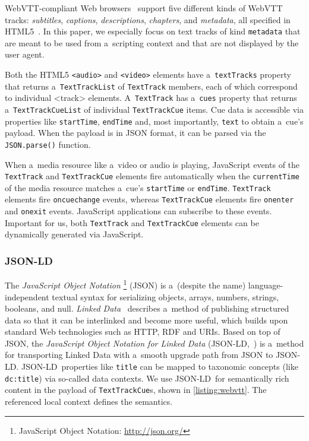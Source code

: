 \documentclass[runningheads,a4paper]{llncs}
\newcommand{\inlinelistingsize}{\fontsize{8pt}{11pt}}
\let\oldurl\url
\renewcommand{\url}[1]{\inlinelistingsize\oldurl{#1}}
\def\JSONLD{\mbox{JSON-LD}}
\def\JSONLD{\mbox{JSON-LD}}
\begin{document}
WebVTT-compliant Web browsers~\cite{dutton2012trackelement}
support five different kinds of
WebVTT tracks: \emph{subtitles}, \emph{captions},
\emph{descriptions}, \emph{chapters}, and \emph{metadata},
all specified in HTML5~\cite{berjon2013html5}.
In this paper, we especially focus on
text tracks of kind \texttt{metadata}
that are meant to be used from a~scripting context and
that are not displayed by the user agent.

Both the HTML5 \texttt{<audio>} and \texttt{<video>} elements
have a~\texttt{textTracks} property
that returns a~\texttt{TextTrackList} of
\texttt{TextTrack} members, each of which correspond
to individual <track> elements.
A~\texttt{TextTrack} has a~\texttt{cues} property
that returns a~\texttt{TextTrackCueList} of individual
\texttt{TextTrackCue} items.
Cue data is accessible via properties like
\texttt{startTime}, \texttt{endTime} and,
most importantly, \texttt{text} to obtain a~cue's payload.
When the payload is in JSON format,
it can be parsed via the
\texttt{JSON.parse()} function.

When a~media resource like a~video or audio is playing,
JavaScript events of the \texttt{TextTrack} and \texttt{TextTrackCue}
elements fire automatically when the \texttt{currentTime}
of the media resource matches
a~cue's \texttt{startTime} or \texttt{endTime}.
\texttt{TextTrack} elements fire \texttt{oncuechange} events,
whereas \texttt{TextTrackCue} elements fire
\texttt{onenter} and \texttt{onexit} events.
JavaScript applications can subscribe to these events.
Important for us, both \texttt{TextTrack} and
\texttt{TextTrackCue} elements
can be dynamically generated via JavaScript.

\subsubsection{\JSONLD}

The \emph{JavaScript Object Notation}%
\footnote{JavaScript Object Notation: \url{http://json.org/}}
(JSON)
is a~(despite the name) language-independent textual syntax
for serializing objects, arrays, numbers, strings, booleans, and null.
\emph{Linked Data}~\cite{bizer2009linkeddata}
describes a~method of publishing structured data
so that it can be interlinked and become more useful,
which builds upon standard Web technologies such as HTTP, RDF and URIs.
Based on top of JSON, the
\emph{JavaScript Object Notation for Linked Data}
(\JSONLD,~\cite{sporny2013jsonld}) is a~method for transporting
Linked Data with a~smooth upgrade path from JSON to \JSONLD.
\JSONLD~properties like \texttt{title} can be mapped to taxonomic
concepts (like \texttt{dc:title}) via so-called data contexts.
We use \JSONLD\ for semantically rich content
in the payload of \texttt{TextTrackCue}s, shown in
\autoref{listing:webvtt}.
The referenced local context defines the semantics.
\end{document}
